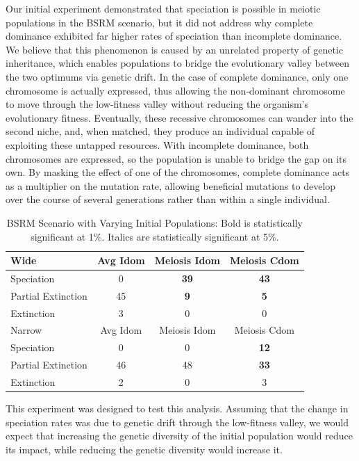 \documentclass[conference]{IEEEtran}
\begin{document}
Our initial experiment demonstrated that speciation is possible in meiotic populations in the BSRM scenario, but it did not address why complete dominance exhibited far higher rates of speciation than incomplete dominance. We believe that this phenomenon is caused by an unrelated property of genetic inheritance, which enables populations to bridge the evolutionary valley between the two optimums via genetic drift. In the case of complete dominance, only one chromosome is actually expressed, thus allowing the non-dominant chromosome to move through the low-fitness valley without reducing the organism’s evolutionary fitness. Eventually, these recessive chromosomes can wander into the second niche, and, when matched, they produce an individual capable of exploiting these untapped resources. With incomplete dominance, both chromosomes are expressed, so the population is unable to bridge the gap on its own. By masking the effect of one of the chromosomes, complete dominance acts as a multiplier on the mutation rate, allowing beneficial mutations to develop over the course of several generations rather than within a single individual. 

\begin{table}
\centering
    \caption{
        BSRM Scenario with Varying Initial Populations: Bold is statistically significant at 1\%. Italics are statistically significant at 5\%.}
    \begin{tabular}{| p{2.75cm} *{3}{|c} |}
        \hline
        Wide & Avg Idom & Meiosis Idom & Meiosis Cdom \\ \hline
        Speciation & 0 & \textbf{39} & \textbf{43} \\ \hline
        Partial Extinction & 45 & \textbf{9} & \textbf{5} \\ \hline
        Extinction & 3 & 0 & 0 \\ \hline
        Narrow & Avg Idom & Meiosis Idom & Meiosis Cdom \\ \hline
        Speciation & 0 & 0 & \textbf{12} \\ \hline
        Partial Extinction & 46 & 48 & \textbf{33} \\ \hline
        Extinction & 2 & 0 & 3 \\ \hline
    \end{tabular}
    \label{table:EXP5}
\end{table}

This experiment was designed to test this analysis. Assuming that the change in speciation rates was due to genetic drift through the low-fitness valley, we would expect that increasing the genetic diversity of the initial population would reduce its impact, while reducing the genetic diversity would increase it.
\end{document}
